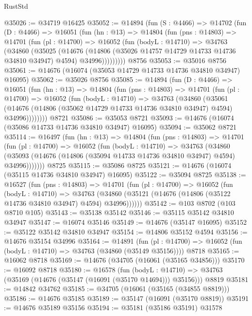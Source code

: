\begin{lexlean}{RustStd}
\begin{coremodule}
@35026 := @34719 @16425
@35052 := @14894
    (fun (S : @4466) =>
    @14702
      (fun (D : @4466) =>
      @16051
        (fun (hn : @13) =>
        @14804
          (fun (pns : @14803) =>
          @14701
            (fun (pl : @14700) =>
            @16052
              (fun (bodyL : @14710) =>
              @34763
                (@34860
                  (@35025
                    (@14676
                      (@14806 (@35026 @14757 @14729 @14733 @14736 @34810 @34947) @4594)
                      @34996)))))))))
    @8756
@35053 := @35016 @8756
@35061 := @14676 (@16074 (@35053 @14729 @14733 @14736 @34810 @34947) @16095)
@35062 := @35026 @8756
@35085 := @14894
    (fun (D : @4466) =>
    @16051
      (fun (hn : @13) =>
      @14804
        (fun (pns : @14803) =>
        @14701
          (fun (pl : @14700) =>
          @16052
            (fun (bodyL : @14710) =>
            @34763
              (@34860
                (@35061
                  (@14676 (@14806 (@35062 @14729 @14733 @14736 @34810 @34947) @4594) @34996))))))))
    @8721
@35086 := @35053 @8721
@35093 := @14676 (@16074 (@35086 @14733 @14736 @34810 @34947) @16095)
@35094 := @35062 @8721
@35114 := @16497
    (fun (hn : @13) =>
    @14804
      (fun (pns : @14803) =>
      @14701
        (fun (pl : @14700) =>
        @16052
          (fun (bodyL : @14710) =>
          @34763
            (@34860
              (@35093 (@14676 (@14806 (@35094 @14733 @14736 @34810 @34947) @4594) @34996)))))))
    @8725
@35115 := @35086 @8725
@35121 := @14676 (@16074 (@35115 @14736 @34810 @34947) @16095)
@35122 := @35094 @8725
@35138 := @16527
    (fun (pns : @14803) =>
    @14701
      (fun (pl : @14700) =>
      @16052
        (fun (bodyL : @14710) =>
        @34763 (@34860 (@35121 (@14676 (@14806 (@35122 @14736 @34810 @34947) @4594) @34996))))))
@35142 := @103 @8702 (@103 @8710 @105)
@35143 := @35138 @35142
@35146 := @35115 @35142 @34810 @34947
@35147 := @16074 @35146
@35149 := @14676 (@35147 @16095)
@35152 := @35122 @35142 @34810 @34947
@35154 := @14806 @35152 @4594
@35156 := @14676 @35154 @34996
@35164 := @14891
    (fun (pl : @14700) => @16052 (fun (bodyL : @14710) => @34763 (@34860 (@35149 @35156))))
    @8718
@35165 := @16062 @8718
@35169 := @14676 (@34705 (@16061 (@35165 @34856)))
@35170 := @16092 @8718
@35180 := @16578
    (fun (bodyL : @14710) => @34763 (@35169 (@14676 (@35147 (@16091 (@35170 @14694))) @35156)))
    @8819
@35181 := @14842 @34762
@35185 := @34705 (@16061 (@35165 (@34855 @8819)))
@35186 := @14676 @35185
@35189 := @35147 (@16091 (@35170 @8819))
@35191 := @14676 @35189 @35156
@35194 := @35181 (@35186 @35191) @31578

\end{coremodule}
\end{lexlean}
